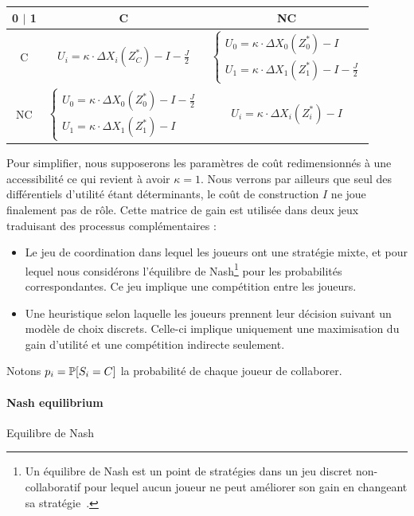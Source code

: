 \begin{center}
\begin{tabular}{ |c|c|c| } 
 \hline
 0 $|$ 1  & C & NC \\ \hline
 C & $U_i = \kappa \cdot \Delta X_i(Z^{\ast}_C) - I - \frac{J}{2}$
   & $\begin{cases}U_0 = \kappa \cdot \Delta X_0(Z^{\ast}_0)-I \\U_1 = \kappa \cdot \Delta X_1(Z^{\ast}_1)-I - \frac{J}{2}\end{cases}$ \\ \hline
 NC & $\begin{cases}U_0 = \kappa \cdot \Delta X_0(Z^{\ast}_0)-I - \frac{J}{2}\\U_1 = \kappa \cdot \Delta X_1(Z^{\ast}_1)-I\end{cases}$
   & $U_i = \kappa \cdot \Delta X_i(Z^{\ast}_i) - I$ \\
 \hline
\end{tabular}
\end{center}

Pour simplifier, nous supposerons les paramètres de coût redimensionnés à une accessibilité ce qui revient à avoir $\kappa = 1$. Nous verrons par ailleurs que seul des différentiels d'utilité étant déterminants, le coût de construction $I$ ne joue finalement pas de rôle. Cette matrice de gain est utilisée dans deux jeux traduisant des processus complémentaires :
\begin{itemize}
	\item Le jeu de coordination dans lequel les joueurs ont une stratégie mixte, et pour lequel nous considérons l'équilibre de Nash\footnote{Un équilibre de Nash est un point de stratégies dans un jeu discret non-collaboratif pour lequel aucun joueur ne peut améliorer son gain en changeant sa stratégie~\cite{ordeshook1986game}.} pour les probabilités correspondantes. Ce jeu implique une compétition entre les joueurs.
	\item Une heuristique selon laquelle les joueurs prennent leur décision suivant un modèle de choix discrets. Celle-ci implique uniquement une maximisation du gain d'utilité et une compétition indirecte seulement.
\end{itemize}

Notons $p_i = \operatorname{\mathbb{P}}\!\left[S_i = C\right]$ la probabilité de chaque joueur de collaborer.


\paragraph{Nash equilibrium}{Equilibre de Nash}

